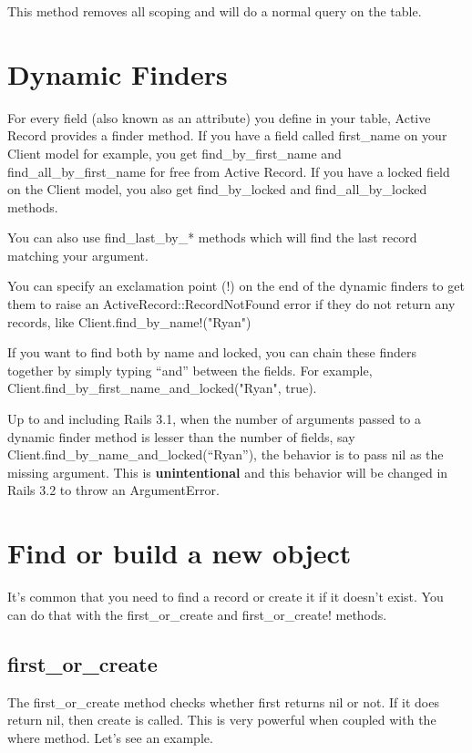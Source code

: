 \documentclass[10pt]{book}
\begin{document}
This method removes all scoping and will do a normal query on the table.

\section{ Dynamic Finders}

For every field (also known as an attribute) you define in your  table, Active Record provides a finder method. If you have a field  called first\_name on your Client model for example, you get find\_by\_first\_name and find\_all\_by\_first\_name for free from Active Record. If you have a locked field on the Client model, you also get find\_by\_locked and find\_all\_by\_locked methods.

You can also use find\_last\_by\_* methods which will find the last record matching your argument.

You can specify an exclamation point (!) on the end of the dynamic finders to get them to raise an ActiveRecord::RecordNotFound error if they do not return any records, like Client.find\_by\_name!("Ryan")

If you want to find both by name and locked, you can chain these finders together by simply typing “and” between the fields. For example, Client.find\_by\_first\_name\_and\_locked("Ryan", true).

Up to and including Rails 3.1, when the number  of arguments passed to a dynamic finder method is lesser than the number  of fields, say Client.find\_by\_name\_and\_locked(“Ryan”), the behavior is to pass nil as the missing argument. This is \textbf{unintentional} and this behavior will be changed in Rails 3.2 to throw an ArgumentError.

\section{ Find or build a new object}

It’s common that you need to find a record or create it if it doesn’t exist. You can do that with the first\_or\_create and first\_or\_create! methods.

\subsection{ first\_or\_create}

The first\_or\_create method checks whether first returns nil or not. If it does return nil, then create is called. This is very powerful when coupled with the where method. Let’s see an example.
\end{document}
